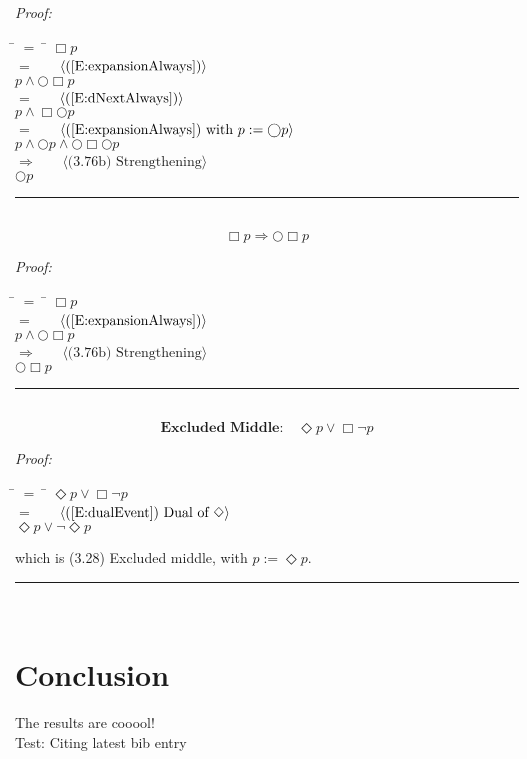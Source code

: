 \documentclass[fleqn, leqno]{article}
\newcommand{\lgap}{2pt}                             %
\newcommand{\mymathindent}{24pt}                      %
\newcommand{\next}{\bigcirc}
\newcommand{\event}{\Diamond}
\newcommand{\always}{\Box}
\newcommand{\myqed}{\hfill\rule[-.23ex]{1.2ex}{2.0ex}}
\newcommand{\Gll} {\langle}                         %
\newcommand{\Ggg} {\rangle}                         %
\newcommand{\Hint}[1]     {\ \ \ $\Gll              \mbox{#1} \Ggg$ }   %
\begin{document}
\emph{Proof:}
\begin{tabbing}
\hspace{\mymathindent} \= $= \;$ \= \kill
  \> \>   $\always p$\\[\lgap]
  \> $=$  \>  \Hint{(\ref{E:expansionAlways})}\\[\lgap]
  \> \>   $p \land \next\always p$\\[\lgap]
  \> $=$  \>  \Hint{(\ref{E:dNextAlways})}\\[\lgap]
  \> \>   $p \land \always\next p$\\[\lgap]
  \> $=$  \>  \Hint{(\ref{E:expansionAlways}) with $p := \next p$}\\[\lgap]
  \> \>   $p \land \next p \land \next\always\next p$\\[\lgap]
  \> $\Rightarrow$  \>  \Hint{(3.76b) Strengthening}\\[\lgap]
  \> \>   $\next p$\\[\lgap]
\end{tabbing}
\myqed\\[\lgap]


\begin{equation}\label{E:impAlwaysNA}
\always p \Rightarrow \next\always p
\end{equation}

\emph{Proof:}
\begin{tabbing}
\hspace{\mymathindent} \= $= \;$ \= \kill
  \> \>   $\always p$\\[\lgap]
  \> $=$  \>  \Hint{(\ref{E:expansionAlways})}\\[\lgap]
  \> \>   $p \land \next\always p$\\[\lgap]
  \> $\Rightarrow$  \>  \Hint{(3.76b) Strengthening}\\[\lgap]
  \> \>   $\next\always p$\\[\lgap]
\end{tabbing}
\myqed\\[\lgap]


\begin{equation}\label{E:excludedMid}
\textbf{Excluded Middle:}\quad \event p \lor \always\lnot p
\end{equation}

\emph{Proof:}
\begin{tabbing}
\hspace{\mymathindent} \= $= \;$ \= \kill
  \> \>   $\event p \lor \always\lnot p$\\[\lgap]
  \> $=$  \>  \Hint{(\ref{E:dualEvent}) Dual of $\event$}\\[\lgap]
  \> \>   $\event p \lor \lnot\event p$\\[\lgap]
\end{tabbing}
which is (3.28) Excluded middle, with $p := \event p$. \myqed\\[\lgap]




\section*{Conclusion}

The results are cooool!\\

Test: Citing latest bib entry\cite{GandS}\\



\end{document}

